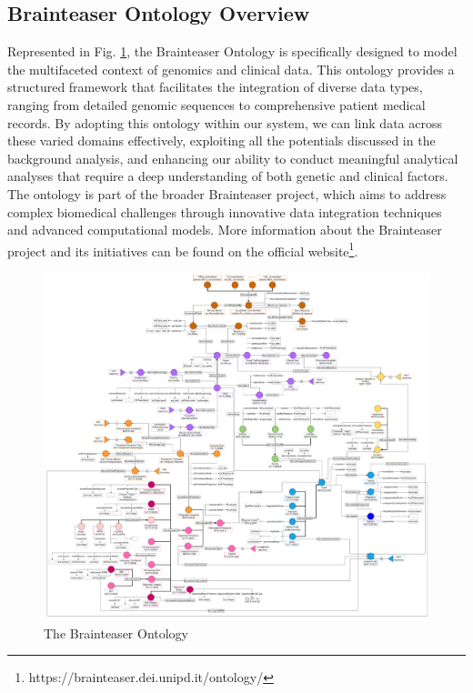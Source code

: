 \subsection{Brainteaser Ontology Overview}
Represented in Fig. \ref{fig:bto}, the Brainteaser Ontology is specifically designed to model the multifaceted context of genomics and clinical data. This ontology provides a structured framework that facilitates the integration of diverse data types, ranging from detailed genomic sequences to comprehensive patient medical records. By adopting this ontology within our system, we can link data across these varied domains effectively, exploiting all the potentials discussed in the background analysis, and enhancing our ability to conduct meaningful analytical analyses that require a deep understanding of both genetic and clinical factors.
The ontology is part of the broader Brainteaser project, which aims to address complex biomedical challenges through innovative data integration techniques and advanced computational models. More information about the Brainteaser project and its initiatives can be found on the official website\footnote{https://brainteaser.dei.unipd.it/ontology/}.
\begin{figure}[ht]
  \centering
  \includegraphics[width=15cm]{res/brainteaser.png}
  \caption{The Brainteaser Ontology}
  \label{fig:bto}
\end{figure}
